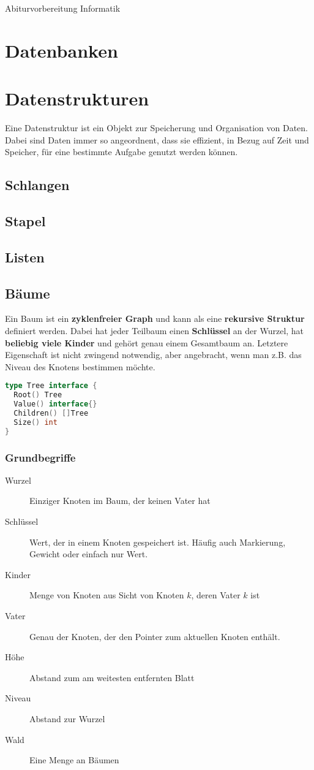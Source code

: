 \documentclass{article}
\begin{document}
\begin{titlepage}
    \begin{center}
        \Huge Abiturvorbereitung Informatik
    \end{center}
\end{titlepage}
\tableofcontents
\pagebreak
\section{Datenbanken}
\section{Datenstrukturen}
Eine Datenstruktur ist ein Objekt zur Speicherung und Organisation von Daten. Dabei sind Daten immer so angeordnent, dass sie effizient, in Bezug auf Zeit und Speicher, für eine bestimmte Aufgabe genutzt werden können.
\subsection{Schlangen}
\subsection{Stapel}
\subsection{Listen}
\subsection{Bäume}
Ein Baum ist ein \textbf{zyklenfreier Graph} und kann als eine \textbf{rekursive Struktur} definiert werden. Dabei hat jeder Teilbaum einen \textbf{Schlüssel} an der Wurzel, hat \textbf{beliebig viele Kinder} und gehört genau einem Gesamtbaum an. Letztere Eigenschaft ist nicht zwingend notwendig, aber angebracht, wenn man z.B. das Niveau des Knotens bestimmen möchte.
\begin{lstlisting}[language=Go]
type Tree interface {
  Root() Tree
  Value() interface{}
  Children() []Tree
  Size() int
}
\end{lstlisting}
\subsubsection{Grundbegriffe}
\begin{description}
    \item[Wurzel] Einziger Knoten im Baum, der keinen Vater hat
    \item[Schlüssel] Wert, der in einem Knoten gespeichert ist. Häufig auch Markierung, Gewicht oder einfach nur Wert.
    \item[Kinder] Menge von Knoten aus Sicht von Knoten $k$, deren Vater $k$ ist  
    \item[Vater] Genau der Knoten, der den Pointer zum aktuellen Knoten enthält. 
    \item[Höhe] Abstand zum am weitesten entfernten Blatt
    \item[Niveau] Abstand zur Wurzel  
    \item[Wald] Eine Menge an Bäumen 
\end{description}
\end{document}
